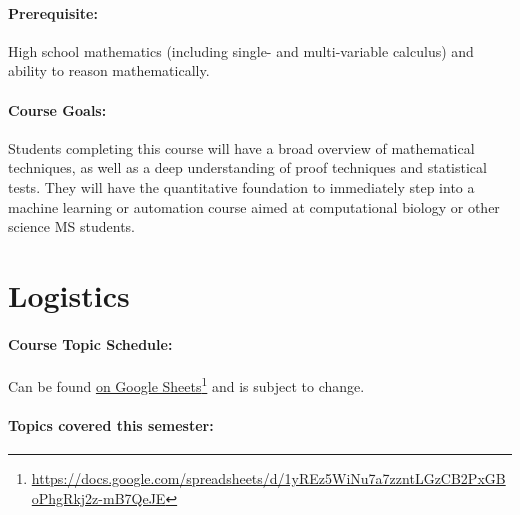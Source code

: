 \documentclass[12pt]{scrartcl}
\begin{document}

\paragraph{Prerequisite:} 
High school mathematics (including single- and multi-variable calculus) and ability to reason mathematically.

\paragraph{Course Goals:} 
Students completing this course will have a broad overview of mathematical techniques, 
as well as a deep understanding of proof techniques and statistical tests. 
They will have the quantitative foundation to immediately step into a machine learning or 
automation course aimed at computational biology or other science MS students. 

\tableofcontents





\clearpage
\section{Logistics}

\paragraph{Course Topic Schedule:} Can be found \href{https://docs.google.com/spreadsheets/d/1yREz5WiNu7a7zzntLGzCB2PxGBoPhgRkj2z-mB7QeJE}{on Google Sheets}\footnote{\url{https://docs.google.com/spreadsheets/d/1yREz5WiNu7a7zzntLGzCB2PxGBoPhgRkj2z-mB7QeJE}}
and is subject to change.


\paragraph{Topics covered this semester:}
\end{document}
